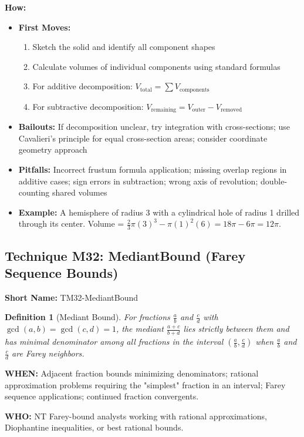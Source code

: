 \documentclass[12pt]{article}
\newtheorem{definition}{Definition}[section]
\begin{document}
\textbf{How:}
\begin{itemize}
    \item \textbf{First Moves:} 
    \begin{enumerate}[nosep]
        \item Sketch the solid and identify all component shapes
        \item Calculate volumes of individual components using standard formulas
        \item For additive decomposition: $V_{\text{total}} = \sum V_{\text{components}}$
        \item For subtractive decomposition: $V_{\text{remaining}} = V_{\text{outer}} - V_{\text{removed}}$
    \end{enumerate}
    \item \textbf{Bailouts:} If decomposition unclear, try integration with cross-sections; use Cavalieri's principle for equal cross-section areas; consider coordinate geometry approach
    \item \textbf{Pitfalls:} Incorrect frustum formula application; missing overlap regions in additive cases; sign errors in subtraction; wrong axis of revolution; double-counting shared volumes
    \item \textbf{Example:} A hemisphere of radius 3 with a cylindrical hole of radius 1 drilled through its center. Volume = $\frac{2}{3}\pi(3)^3 - \pi(1)^2(6) = 18\pi - 6\pi = 12\pi$.
\end{itemize}

\subsection{Technique M32: MediantBound (Farey Sequence Bounds)}
\textbf{Short Name:} TM32-MediantBound

\begin{definition}[Mediant Bound]
For fractions $\frac{a}{b}$ and $\frac{c}{d}$ with $\gcd(a,b)=\gcd(c,d)=1$, the mediant $\frac{a+c}{b+d}$ lies strictly between them and has minimal denominator among all fractions in the interval $(\frac{a}{b}, \frac{c}{d})$ when $\frac{a}{b}$ and $\frac{c}{d}$ are Farey neighbors.
\end{definition}

\textbf{WHEN:} Adjacent fraction bounds minimizing denominators; rational approximation problems requiring the "simplest" fraction in an interval; Farey sequence applications; continued fraction convergents.

\textbf{WHO:} NT Farey-bound analysts working with rational approximations, Diophantine inequalities, or best rational bounds.
\end{document}
